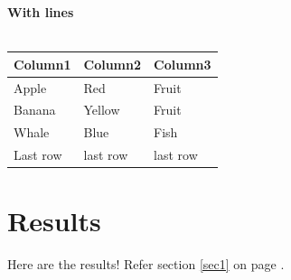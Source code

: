 \documentclass[a4paper, 12pt]{article}
\begin{document}
\textbf{With lines}\\
\\
\begin{tabular}{|l|l|l|}
\hline
\textbf{Column1} & \textbf{Column2} & \textbf{Column3} \\
\hline
Apple & Red & Fruit \\
\hline
Banana & Yellow & Fruit\\
\hline
Whale & Blue & Fish\\
\hline \hline
Last row &last row & last row\\
\hline
\end{tabular}





\section{Results}
Here are the results! Refer section \ref{sec1} on page \pageref{sec1}.



\end{document}
